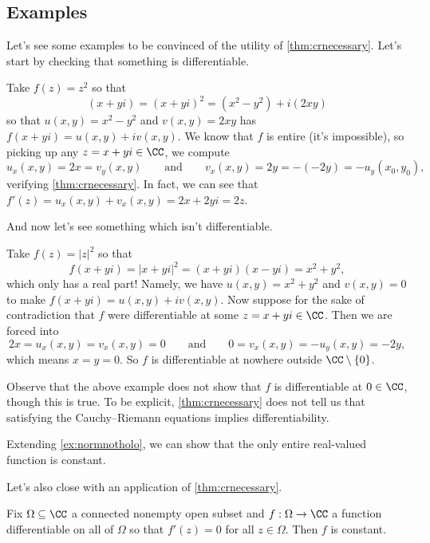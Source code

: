 \subsection{Examples}
Let's see some examples to be convinced of the utility of \autoref{thm:crnecessary}. Let's start by checking that something is differentiable.
\begin{example}
	Take $f(z)=z^2$ so that 
	\[(x+yi)=(x+yi)^2=\left(x^2-y^2\right)+i(2xy)\]
	so that $u(x,y)=x^2-y^2$ and $v(x,y)=2xy$ has $f(x+yi)=u(x,y)+iv(x,y)$. We know that $f$ is entire (it's impossible), so picking up any $z=x+yi\in\CC$, we compute
	\[u_x(x,y)=2x=v_y(x,y)\qquad\text{and}\qquad v_x(x,y)=2y=-(-2y)=-u_y(x_0,y_0),\]
	verifying \autoref{thm:crnecessary}. In fact, we can see that $f'(z)=u_x(x,y)+v_x(x,y)=2x+2yi=2z$.
\end{example}
And now let's see something which isn't differentiable.
\begin{example} \label{ex:normnotholo}
	Take $f(z)=|z|^2$ so that
	\[f(x+yi)=|x+yi|^2=(x+yi)(x-yi)=x^2+y^2,\]
	which only has a real part! Namely, we have $u(x,y)=x^2+y^2$ and $v(x,y)=0$ to make $f(x+yi)=u(x,y)+iv(x,y)$. Now suppose for the sake of contradiction that $f$ were differentiable at some $z=x+yi\in\CC$. Then we are forced into
	\[2x=u_x(x,y)=v_x(x,y)=0\qquad\text{and}\qquad0=v_x(x,y)=-u_y(x,y)=-2y,\]
	which means $x=y=0$. So $f$ is differentiable at nowhere outside $\CC\setminus\{0\}$.
\end{example}
Observe that the above example does not show that $f$ is differentiable at $0\in\CC$, though this is true. To be explicit, \autoref{thm:crnecessary} does not tell us that satisfying the Cauchy--Riemann equations implies differentiability.
\begin{remark}
	Extending \autoref{ex:normnotholo}, we can show that the only entire real-valued function is constant.
\end{remark}
Let's also close with an application of \autoref{thm:crnecessary}.
\begin{corollary} \label{cor:getconstant}
	Fix $\Omega\subseteq\CC$ a connected nonempty open subset and $f:\Omega\to\CC$ a function differentiable on all of $\Omega$ so that $f'(z)=0$ for all $z\in\Omega$. Then $f$ is constant.
\end{corollary}
